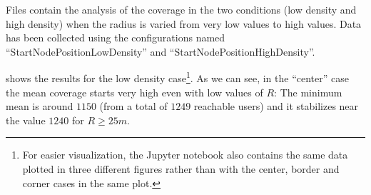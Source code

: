 Files  contain the analysis of the
coverage in the two conditions (low density and high density) when the radius is
varied from very low values to high values. Data has been collected using the
configurations named ``StartNodePositionLowDensity'' and
``StartNodePositionHighDensity''.

 shows the results for the low density
case\footnote{For easier visualization, the Jupyter notebook also contains the
same data plotted in three different figures rather than with the center, border
and corner cases in the same plot.}. As we can see, in the ``center'' case the
mean coverage starts very high even with low values of \(R\): The minimum mean
is around \(1150\) (from a total of \(1249\) reachable users) and it stabilizes
near the value \(1240\) for \(R \ge 25m\).

